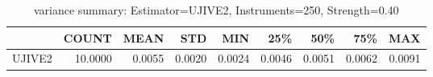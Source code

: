 \begin{table}[ht]
\centering
\caption{variance summary: Estimator=UJIVE2, Instruments=250, Strength=0.40}
\begin{tabular}{lrrrrrrrr}
\toprule
 & COUNT & MEAN & STD & MIN & 25\% & 50\% & 75\% & MAX \\
\midrule
UJIVE2 & 10.0000 & 0.0055 & 0.0020 & 0.0024 & 0.0046 & 0.0051 & 0.0062 & 0.0091 \\
\bottomrule
\end{tabular}
\end{table}
